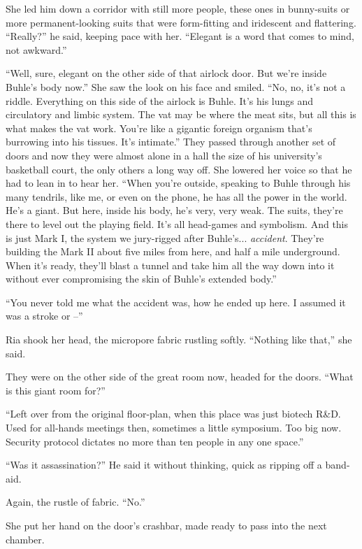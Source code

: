 She led him down a corridor with still more people, these ones in 
bunny-suits or more permanent-looking suits that were form-fitting and 
iridescent and flattering. “Really?” he said, keeping pace with 
her. “Elegant is a word that comes to mind, not awkward.”

“Well, sure, elegant on the other side of that airlock door. But 
we're inside Buhle's body now.” She saw the look on his face and 
smiled. “No, no, it's not a riddle. Everything on this side of the 
airlock is Buhle. It's his lungs and circulatory and limbic system. The 
vat may be where the meat sits, but all this is what makes the vat 
work. You're like a gigantic foreign organism that's burrowing into his 
tissues. It's intimate.” They passed through another set of doors and 
now they were almost alone in a hall the size of his university's 
basketball court, the only others a long way off. She lowered her voice 
so that he had to lean in to hear her. “When you're outside, speaking 
to Buhle through his many tendrils, like me, or even on the phone, he 
has all the power in the world. He's a giant. But here, inside his 
body, he's very, very weak. The suits, they're there to level out the 
playing field. It's all head-games and symbolism. And this is just Mark 
I, the system we jury-rigged after Buhle's... \emph{accident}. They're 
building the Mark II about five miles from here, and half a mile 
underground. When it's ready, they'll blast a tunnel and take him all 
the way down into it without ever compromising the skin of Buhle's 
extended body.”

“You never told me what the accident was, how he ended up here. I 
assumed it was a stroke or --”

Ria shook her head, the micropore fabric rustling softly. “Nothing 
like that,” she said.

They were on the other side of the great room now, headed for the 
doors. “What is this giant room for?”

“Left over from the original floor-plan, when this place was just 
biotech R{\&}D. Used for all-hands meetings then, sometimes a little 
symposium. Too big now. Security protocol dictates no more than ten 
people in any one space.”

“Was it assassination?” He said it without thinking, quick as 
ripping off a band-aid.

Again, the rustle of fabric. “No.”

She put her hand on the door's crashbar, made ready to pass into the 
next chamber.


